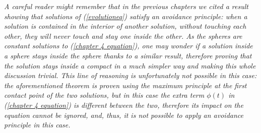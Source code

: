 \begin{oss}\em
	A careful reader might remember that in the previous chapters we cited a result showing that solutions of (\ref{evolutioneq}) satisfy an \textit{avoidance principle}: when a solution is contained in the interior of another solution, without touching each other, they will never touch and stay one inside the other. As the spheres are constant solutions to (\ref{chapter 4 equation}), one may wonder if a solution inside a sphere stays inside the sphere thanks to a similar result, therefore proving that the solution stays inside a compact in a much simpler way and making this whole discussion trivial. This line of reasoning is unfortunately not possible in this case: the aforementioned theorem is proven using the maximum principle at the first contact point of the two solutions, but in this case the extra term $\phi(t)$ in (\ref{chapter 4 equation}) is different between the two, therefore its impact on the equation cannot be ignored, and, thus, it is not possible to apply an avoidance principle in this case.
\end{oss}

